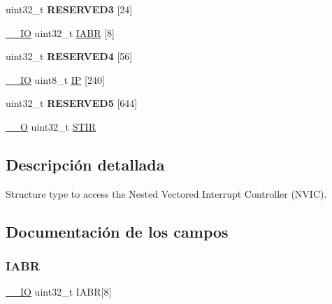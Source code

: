 \begin{DoxyCompactItemize}
\item 
\mbox{\label{struct_n_v_i_c___type_a3371761ff5e69fb1b6b3c2c3b4d69b18}} 
uint32\+\_\+t {\bfseries R\+E\+S\+E\+R\+V\+E\+D3} \mbox{[}24\mbox{]}
\item 
\mbox{\hyperlink{core__cm3_8h_aec43007d9998a0a0e01faede4133d6be}{\+\_\+\+\_\+\+IO}} uint32\+\_\+t \mbox{\hyperlink{struct_n_v_i_c___type_ac8694e172f431db09b5d570993da3917}{I\+A\+BR}} \mbox{[}8\mbox{]}
\item 
\mbox{\label{struct_n_v_i_c___type_a0c75e6c517dc8e5596ffa3ef6285c232}} 
uint32\+\_\+t {\bfseries R\+E\+S\+E\+R\+V\+E\+D4} \mbox{[}56\mbox{]}
\item 
\mbox{\hyperlink{core__cm3_8h_aec43007d9998a0a0e01faede4133d6be}{\+\_\+\+\_\+\+IO}} uint8\+\_\+t \mbox{\hyperlink{struct_n_v_i_c___type_a38c377984f751265667317981f101bb4}{IP}} \mbox{[}240\mbox{]}
\item 
\mbox{\label{struct_n_v_i_c___type_a77017390737a14d5eb4cdb41f0aa3dce}} 
uint32\+\_\+t {\bfseries R\+E\+S\+E\+R\+V\+E\+D5} \mbox{[}644\mbox{]}
\item 
\mbox{\hyperlink{core__cm3_8h_a7e25d9380f9ef903923964322e71f2f6}{\+\_\+\+\_\+O}} uint32\+\_\+t \mbox{\hyperlink{struct_n_v_i_c___type_a471c399bb79454dcdfb342a31a5684ae}{S\+T\+IR}}
\end{DoxyCompactItemize}


\subsection{Descripción detallada}
Structure type to access the Nested Vectored Interrupt Controller (N\+V\+IC). 

\subsection{Documentación de los campos}
\mbox{\label{struct_n_v_i_c___type_ac8694e172f431db09b5d570993da3917}} 
\subsubsection{\texorpdfstring{I\+A\+BR}{IABR}}
{\footnotesize\ttfamily \mbox{\hyperlink{core__cm3_8h_aec43007d9998a0a0e01faede4133d6be}{\+\_\+\+\_\+\+IO}} uint32\+\_\+t I\+A\+BR\mbox{[}8\mbox{]}}

